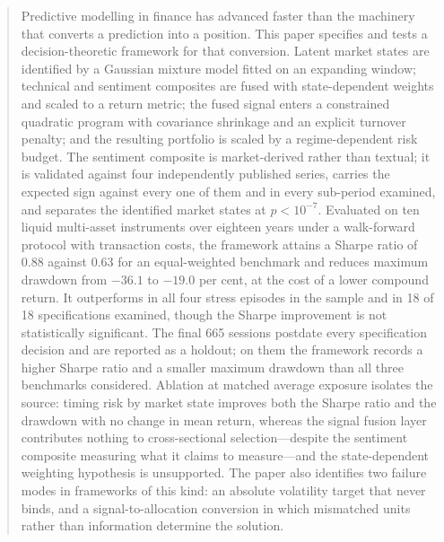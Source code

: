 \documentclass{singlecol-new}
\theoremstyle{TH}{
\newtheorem{lemma}{Lemma}
\newtheorem{theorem}[lemma]{Theorem}
\newtheorem{corrolary}[lemma]{Corrolary}
\newtheorem{conjecture}[lemma]{Conjecture}
\newtheorem{proposition}[lemma]{Proposition}
\newtheorem{claim}[lemma]{Claim}
\newtheorem{stheorem}[lemma]{Wrong Theorem}
\newtheorem{algorithm}{Algorithm}
}
\theoremstyle{THrm}{
\newtheorem{definition}{Definition}[section]
\newtheorem{question}{Question}[section]
\newtheorem{remark}{Remark}
\newtheorem{scheme}{Scheme}
}
\theoremstyle{THhit}{
\newtheorem{case}{Case}[section]
}
\begin{document}
\begin{abstract}
Predictive modelling in finance has advanced faster than the machinery that converts a
prediction into a position. This paper specifies and tests a decision-theoretic
framework for that conversion. Latent market states are identified by a Gaussian
mixture model fitted on an expanding window; technical and sentiment composites are
fused with state-dependent weights and scaled to a return metric; the fused signal
enters a constrained quadratic program with covariance shrinkage and an explicit
turnover penalty; and the resulting portfolio is scaled by a regime-dependent risk
budget. The sentiment composite is market-derived rather than textual; it is
validated against four independently published series, carries the expected sign
against every one of them and in every sub-period examined, and separates the
identified market states at $p < 10^{-7}$. Evaluated on ten liquid multi-asset instruments over eighteen years under a
walk-forward protocol with transaction costs, the framework attains a Sharpe ratio of
0.88 against 0.63 for an equal-weighted benchmark and reduces maximum drawdown from
$-36.1$ to $-19.0$ per cent, at the cost of a lower compound return. It outperforms in
all four stress episodes in the sample and in 18 of 18 specifications examined, though
the Sharpe improvement is not statistically significant. The final 665 sessions
postdate every specification decision and are reported as a holdout; on them the
framework records a higher Sharpe ratio and a smaller maximum drawdown than all three
benchmarks considered. Ablation at matched average exposure isolates the source: timing
risk by market state improves both the Sharpe ratio and the drawdown with no change in
mean return, whereas the signal fusion layer contributes nothing to cross-sectional
selection---despite the sentiment composite measuring what it claims to measure---and
the state-dependent weighting hypothesis is unsupported. The paper also identifies two
failure modes in frameworks of this kind: an absolute volatility target that never
binds, and a signal-to-allocation conversion in which mismatched units rather than
information determine the solution.
\end{abstract}


\REF{}

\begin{bio}

\end{bio}
\end{document}
